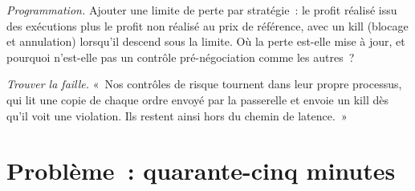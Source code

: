 \begin{exercise}[$\star\star\star$]\label{exo:ll:pre-trade-risk-and-kill-switches:7}
\emph{Programmation.} Ajouter une limite de perte par stratégie~: le profit réalisé issu des exécutions plus le profit non réalisé au prix de référence, avec
un kill (blocage et annulation) lorsqu'il descend sous la limite. Où la perte est-elle mise à jour, et pourquoi n'est-elle pas un contrôle pré-négociation comme les
autres~?
\end{exercise}

\begin{exercise}[$\star\star\star$]\label{exo:ll:pre-trade-risk-and-kill-switches:8}
\emph{Trouver la faille.} «~Nos contrôles de risque tournent dans leur propre processus, qui lit une copie de chaque ordre envoyé par la passerelle et envoie
un kill dès qu'il voit une violation. Ils restent ainsi hors du chemin de latence.~»
\end{exercise}

\section{Problème~: quarante-cinq minutes}

